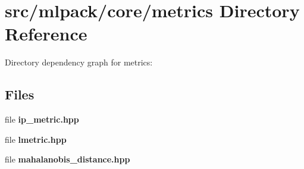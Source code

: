 \section{src/mlpack/core/metrics Directory Reference}
\label{dir_f49c0cad6d7713ea1863882a9c623a32}
Directory dependency graph for metrics\-:
\subsection*{Files}
\begin{DoxyCompactItemize}
\item 
file {\bf ip\-\_\-metric.\-hpp}
\item 
file {\bf lmetric.\-hpp}
\item 
file {\bf mahalanobis\-\_\-distance.\-hpp}
\end{DoxyCompactItemize}
